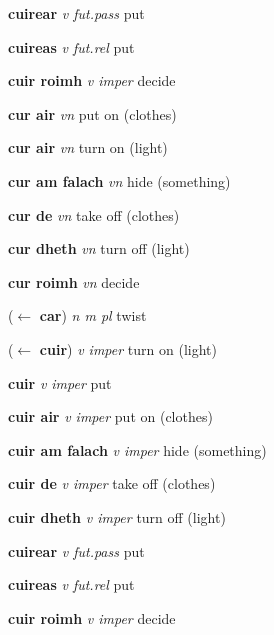\documentclass[a4paper,12pt, oneside]{article}
\newcommand \hw[1]{{\color{mygreen}{\large{\headword #1}}}}
\newcommand \lw[1]{{\textbf{\lemword #1}}}
\newcommand \sw[1]{{\textbf{{\subword #1}}}}
\begin{document}
\hspace{10mm} \sw{cuirear} \textit{v    fut.pass} put  

\hspace{10mm} \sw{cuireas} \textit{v    fut.rel} put  

\hspace{10mm} \sw{cuir roimh} \textit{v    imper} decide  

\hspace{10mm} \sw{cur air} \textit{vn    } put on (clothes) 

\hspace{10mm} \sw{cur air} \textit{vn    } turn on  (light) 

\hspace{10mm} \sw{cur am falach} \textit{vn    } hide (something) 

\hspace{10mm} \sw{cur de} \textit{vn    } take off (clothes) 

\hspace{10mm} \sw{cur dheth} \textit{vn    } turn off (light) 

\hspace{10mm} \sw{cur roimh} \textit{vn    } decide  

\hw{cuir} ($\leftarrow$ \lw{car}) \textit{n m pl  } twist  

\hw{cuir air} ($\leftarrow$ \lw{cuir}) \textit{v    imper} turn on (light) 

\hspace{10mm} \sw{cuir} \textit{v    imper} put  

\hspace{10mm} \sw{cuir air} \textit{v    imper} put on (clothes) 

\hspace{10mm} \sw{cuir am falach} \textit{v    imper} hide (something) 

\hspace{10mm} \sw{cuir de} \textit{v    imper} take off (clothes) 

\hspace{10mm} \sw{cuir dheth} \textit{v    imper} turn off (light) 

\hspace{10mm} \sw{cuirear} \textit{v    fut.pass} put  

\hspace{10mm} \sw{cuireas} \textit{v    fut.rel} put  

\hspace{10mm} \sw{cuir roimh} \textit{v    imper} decide  
\end{document}
